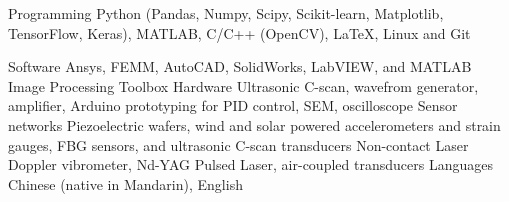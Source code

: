 

\begin{cvskillsv}

  \cvskillv
    {Programming} %
    {Python (Pandas, Numpy, Scipy, Scikit-learn, Matplotlib, TensorFlow, Keras), MATLAB, C/C++ (OpenCV), LaTeX, Linux and Git} %
    
  \cvskill
    {Software} %
    {Ansys, FEMM, AutoCAD, SolidWorks, LabVIEW, and MATLAB Image Processing Toolbox} %
  \cvskill
    {Hardware} %
    {Ultrasonic C-scan, wavefrom generator, amplifier, Arduino prototyping for PID control, SEM, oscilloscope} %
  \cvskill
    {Sensor networks} %
    {Piezoelectric wafers, wind and solar powered accelerometers and strain gauges, FBG sensors, and ultrasonic C-scan transducers} %
   \cvskill
    {Non-contact} %
    {Laser Doppler vibrometer, Nd-YAG Pulsed Laser, air-coupled transducers} %
   \cvskill
    {Languages} %
    {Chinese (native in Mandarin), English} %

     


\end{cvskillsv}

